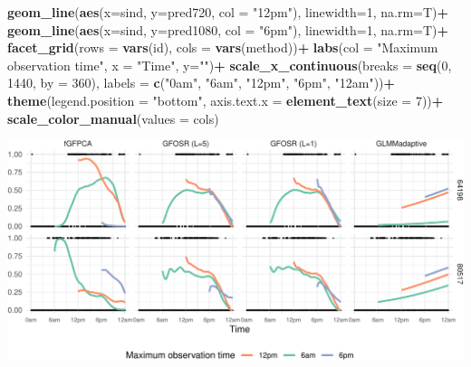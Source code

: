\documentclass[
]{article}
\newenvironment{Shaded}{\begin{snugshade}}{\end{snugshade}}
\newcommand{\AttributeTok}[1]{\textcolor[rgb]{0.13,0.29,0.53}{#1}}
\newcommand{\DecValTok}[1]{\textcolor[rgb]{0.00,0.00,0.81}{#1}}
\newcommand{\FunctionTok}[1]{\textcolor[rgb]{0.13,0.29,0.53}{\textbf{#1}}}
\newcommand{\NormalTok}[1]{#1}
\newcommand{\SpecialCharTok}[1]{\textcolor[rgb]{0.81,0.36,0.00}{\textbf{#1}}}
\newcommand{\StringTok}[1]{\textcolor[rgb]{0.31,0.60,0.02}{#1}}
\begin{document}
\begin{Shaded}
\begin{Highlighting}[]
  \FunctionTok{geom\_line}\NormalTok{(}\FunctionTok{aes}\NormalTok{(}\AttributeTok{x=}\NormalTok{sind, }\AttributeTok{y=}\NormalTok{pred720, }\AttributeTok{col =} \StringTok{"12pm"}\NormalTok{), }\AttributeTok{linewidth=}\DecValTok{1}\NormalTok{, }\AttributeTok{na.rm=}\NormalTok{T)}\SpecialCharTok{+}
  \FunctionTok{geom\_line}\NormalTok{(}\FunctionTok{aes}\NormalTok{(}\AttributeTok{x=}\NormalTok{sind, }\AttributeTok{y=}\NormalTok{pred1080, }\AttributeTok{col =} \StringTok{"6pm"}\NormalTok{), }\AttributeTok{linewidth=}\DecValTok{1}\NormalTok{, }\AttributeTok{na.rm=}\NormalTok{T)}\SpecialCharTok{+}
  \FunctionTok{facet\_grid}\NormalTok{(}\AttributeTok{rows =} \FunctionTok{vars}\NormalTok{(id), }\AttributeTok{cols =} \FunctionTok{vars}\NormalTok{(method))}\SpecialCharTok{+}
  \FunctionTok{labs}\NormalTok{(}\AttributeTok{col =} \StringTok{"Maximum observation time"}\NormalTok{, }\AttributeTok{x =} \StringTok{"Time"}\NormalTok{, }\AttributeTok{y=}\StringTok{""}\NormalTok{)}\SpecialCharTok{+}
  \FunctionTok{scale\_x\_continuous}\NormalTok{(}\AttributeTok{breaks =} \FunctionTok{seq}\NormalTok{(}\DecValTok{0}\NormalTok{, }\DecValTok{1440}\NormalTok{, }\AttributeTok{by =} \DecValTok{360}\NormalTok{),}
                     \AttributeTok{labels =} \FunctionTok{c}\NormalTok{(}\StringTok{"0am"}\NormalTok{, }\StringTok{"6am"}\NormalTok{, }\StringTok{"12pm"}\NormalTok{, }\StringTok{"6pm"}\NormalTok{, }\StringTok{"12am"}\NormalTok{))}\SpecialCharTok{+}
  \FunctionTok{theme}\NormalTok{(}\AttributeTok{legend.position =} \StringTok{"bottom"}\NormalTok{, }\AttributeTok{axis.text.x =} \FunctionTok{element\_text}\NormalTok{(}\AttributeTok{size =} \DecValTok{7}\NormalTok{))}\SpecialCharTok{+}
  \FunctionTok{scale\_color\_manual}\NormalTok{(}\AttributeTok{values =}\NormalTok{ cols)}
\end{Highlighting}
\end{Shaded}

\includegraphics{manuscript_files/figure-latex/fig_appl_pre-1.pdf}
\end{document}

